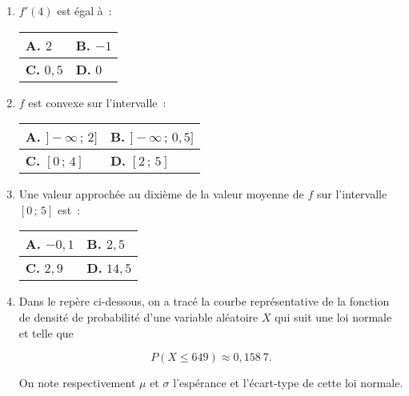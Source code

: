 \begin{enumerate}
     \item $f'(4)$ est égal à~:
     \begin{center}
          \begin{tabularx}{0.8\linewidth}{|X|X|}%
               \hline
               \textbf{A.} \quad $2$ & \textbf{B.} \quad $-1$\\
               \hline
               \textbf{C.} \quad $0,5$ & \textbf{D.} \quad $0$\\
               \hline
          \end{tabularx}
     \end{center}
     \item $f$ est convexe sur l'intervalle~:
     \begin{center}
          \begin{tabularx}{0.8\linewidth}{|X|X|}%
               \hline
               \textbf{A.} \quad $]-\infty\,;\,2]$ & \textbf{B.} \quad $]-\infty\,;\,0,5]$\\
               \hline
               \textbf{C.} \quad $[0\,;\,4]$ & \textbf{D.} \quad $[2\,;\,5]$\\
               \hline
          \end{tabularx}
     \end{center}
     \item Une valeur approchée au dixième de la valeur moyenne de $f$ sur l'intervalle $[0\,;\,5]$ est~:
     \begin{center}
          \begin{tabularx}{0.8\linewidth}{|X|X|}%
               \hline
               \textbf{A.} \quad $-0,1$ & \textbf{B.} \quad $2,5$\\
               \hline
               \textbf{C.} \quad $2,9$ & \textbf{D.} \quad $14,5$\\
               \hline
          \end{tabularx}
     \end{center}
     \item Dans le repère ci-dessous, on a tracé la courbe représentative de la fonction de densité de probabilité d'une variable aléatoire $X$ qui suit une loi normale et telle que
     \par
     \[P(X \leqslant 649) \approx 0,158~7.\]
     \par
     On note respectivement $\mu$ et $\sigma$ l'espérance et l'écart-type de cette loi normale.
     \begin{center}

\end{center}
\end{enumerate}
